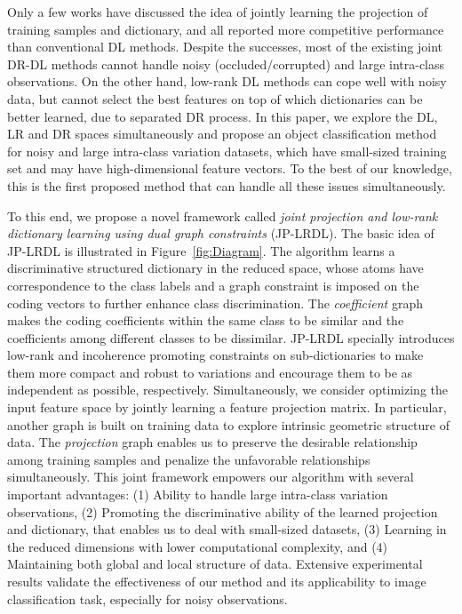 \documentclass[journal]{IEEEtran}
\begin{document}
Only a few works have discussed the idea of jointly learning the projection of training samples and dictionary, and all reported more competitive performance than conventional DL methods. Despite the successes, most of the existing joint DR-DL methods cannot handle noisy (occluded/corrupted) and large intra-class observations. On the other hand, low-rank DL methods can cope well with noisy data, but cannot select the best features on top of which dictionaries can be better learned, due to separated DR process. In this paper, we explore the DL, LR and DR spaces simultaneously and propose an object classification method for noisy and large intra-class variation datasets, which have small-sized training set and may have high-dimensional feature vectors. To the best of our knowledge, this is the first proposed method that can handle all these issues simultaneously.

To this end, we propose a novel framework called \textit{joint projection and low-rank dictionary learning using dual graph constraints} (JP-LRDL). The basic idea of JP-LRDL is illustrated in Figure~\ref{fig:Diagram}. The algorithm learns a discriminative structured dictionary in the reduced space, whose atoms have correspondence to the class labels and a graph constraint is imposed on the coding vectors to further enhance class discrimination. The \textit{coefficient} graph makes the coding coefficients within the same class to be similar and the coefficients among different classes to be dissimilar. JP-LRDL specially introduces low-rank and incoherence promoting constraints on sub-dictionaries to make them more compact and robust to variations and encourage them to be as independent as possible, respectively. Simultaneously, we consider optimizing the input feature space by jointly learning a feature projection matrix. In particular, another graph is built on training data to explore intrinsic geometric structure of data. The \textit{projection} graph enables us to preserve the desirable relationship among training samples and penalize the unfavorable relationships simultaneously. This joint framework empowers our algorithm with several important advantages: (1) Ability to handle large intra-class variation observations, (2) Promoting the discriminative ability of the learned projection and dictionary, that enables us to deal with small-sized datasets, (3) Learning in the reduced dimensions with lower computational complexity, and (4) Maintaining both global and local structure of data. Extensive experimental results validate the effectiveness of our method and its applicability to image classification task, especially for noisy observations. 
\end{document}
